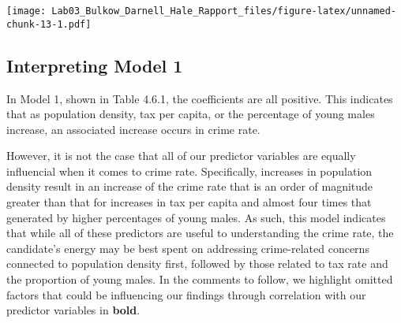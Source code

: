 \documentclass[]{article}
\begin{document}
\texttt{[image: Lab03\_Bulkow\_Darnell\_Hale\_Rapport\_files/figure-latex/unnamed-chunk-13-1.pdf]}

\subsection{Interpreting Model 1}\label{interpreting-model-1}

In Model 1, shown in Table 4.6.1, the coefficients are all positive.
This indicates that as population density, tax per capita, or the
percentage of young males increase, an associated increase occurs in
crime rate.

However, it is not the case that all of our predictor variables are
equally influencial when it comes to crime rate. Specifically, increases
in population density result in an increase of the crime rate that is an
order of magnitude greater than that for increases in tax per capita and
almost four times that generated by higher percentages of young males.
As such, this model indicates that while all of these predictors are
useful to understanding the crime rate, the candidate's energy may be
best spent on addressing crime-related concerns connected to population
density first, followed by those related to tax rate and the proportion
of young males. In the comments to follow, we highlight omitted factors
that could be influencing our findings through correlation with our
predictor variables in \textbf{bold}.
\end{document}

